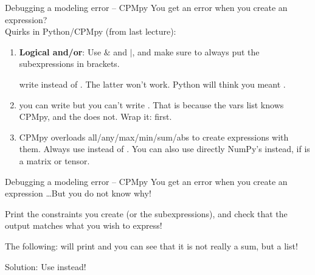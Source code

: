 \documentclass{cons-beamer}
\begin{document}
\begin{flashcardcpmpy}  %
\begin{frame}{Debugging a modeling error -- CPMpy}
  You get an error when you create an expression?  \\ Quirks in Python/CPMpy (from last lecture):
  \vfill
  
  \begin{enumerate}
    \item \textbf{Logical and/or}:
          Use $\&$ and $|$, and make sure to always put the subexpressions in brackets. 
          \vfill

          \begin{example}
            write  instead of . The latter won't work.
            Python will think you meant .
          \end{example}
          \vfill
      
    \item you can write  but you can’t write . That is because the vars list knows CPMpy, and the  does not. Wrap it:  first.
          \vfill
  
    \item CPMpy overloads all/any/max/min/sum/abs to create expressions with them. Always use  instead of . You can also use directly NumPy's  instead, if  is a matrix or tensor.
  \end{enumerate}
\end{frame}

\begin{frame}{Debugging a modeling error -- CPMpy}
  You get an error when you create an expression \dots  But you do not know why!
  \vfill
  
  Print the constraints you create (or the subexpressions), and check that the output matches what you wish to express!
  \vfill

  \begin{example}
    The following:     
    will print \cpminline{[(IV0) + (IV2) (IV1) + (IV3)]}
    and you can see that it is not really a sum, but a list!

    Solution: Use  instead!
  \end{example}
    
\end{frame}
\end{flashcardcpmpy}
\end{document}
